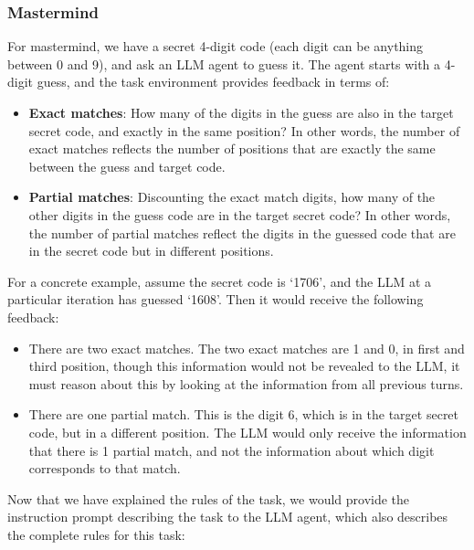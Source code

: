 \documentclass{article}
\theoremstyle{plain}
\theoremstyle{definition}
\theoremstyle{remark}
\begin{document}
\subsubsection{Mastermind}
For mastermind, we have a secret 4-digit code (each digit can be anything between 0 and 9), and ask an LLM agent to guess it. The agent starts with a 4-digit guess, and the task environment provides feedback in terms of:
\begin{itemize}
    \item \textbf{Exact matches}: How many of the digits in the guess are also in the target secret code, and exactly in the same position? In other words, the number of exact matches reflects the number of positions that are exactly the same between the guess and target code.
    \item \textbf{Partial matches}: Discounting the exact match digits, how many of the other digits in the guess code are in the target secret code? In other words, the number of partial matches reflect the digits in the guessed code that are in the secret code but in different positions.
\end{itemize}
For a concrete example, assume the secret code is `1706', and the LLM at a particular iteration has guessed `1608'. Then it would receive the following feedback:
\begin{itemize}
    \item There are two exact matches. The two exact matches are 1 and 0, in first and third position, though this information would not be revealed to the LLM, it must reason about this by looking at the information from all previous turns.
    \item There are one partial match. This is the digit 6, which is in the target secret code, but in a different position. The LLM would only receive the information that there is 1 partial match, and not the information about which digit corresponds to that match.
\end{itemize}
Now that we have explained the rules of the task, we would provide the instruction prompt describing the task to the LLM agent, which also describes the complete rules for this task:
\end{document}
